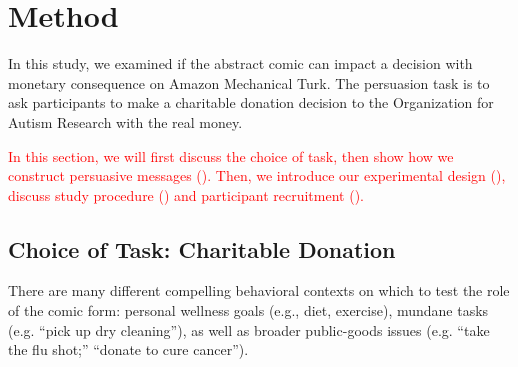 \section{Method}
\label{sec:Method}
In this study, we examined if the abstract comic can impact a decision with monetary consequence on Amazon Mechanical Turk. The persuasion task is to ask participants to make a charitable donation decision to the Organization for Autism Research with the real money. 

\textcolor{red}{In this section, we will first discuss the choice of task, then show how we construct persuasive messages (). Then, we introduce our experimental design (), discuss study procedure () and participant recruitment ().}


\subsection{Choice of Task: Charitable Donation}
\label{sub:Choice of Task: Charitable Donation}


There are many different compelling behavioral contexts on which to test the role of the comic form: personal wellness goals (e.g., diet, exercise), mundane tasks (e.g. ``pick up dry cleaning''), as well as broader public-goods issues (e.g. ``take the flu shot;'' ``donate to cure cancer'').

